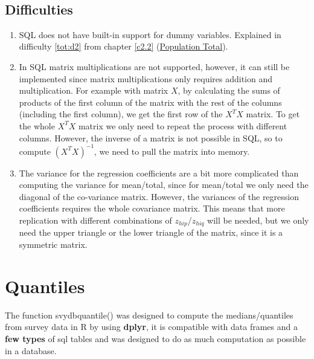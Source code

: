 \\
\subsection{Difficulties}
\begin{enumerate}
\item {\sf SQL} does not have built-in support for dummy variables. Explained in difficulty \ref{tot:d2} from chapter \ref{c2.2} (\hyperref[c2:tot]{Population Total}).

\item In {\sf SQL} matrix multiplications are not supported, however, it can still be implemented since matrix multiplications only requires addition and multiplication. For example with matrix $X$, by calculating the sums of products of the first column of the matrix with the rest of the columns (including the first column), we get the first row of the $X^TX$ matrix. To get the whole $X^TX$ matrix we only need to repeat the process with different columns. However, the inverse of a matrix is not possible in {\sf SQL}, so to compute $(X^TX)^{-1}$, we need to pull the matrix into memory. 

\item The variance for the regression coefficients are a bit more complicated than computing the variance for mean/total, since for mean/total we only need the diagonal of the co-variance matrix. However, the variances of the regression coefficients requires the whole covariance matrix. This means that more replication with different combinations of $z_{hip}$/$z_{hiq}$ will be needed, but we only need the upper triangle or the lower triangle of the matrix, since it is a symmetric matrix.
\end{enumerate}



\newpage
\section{Quantiles}

The function {\ttfamily svydbquantile()} was designed to compute the medians/quantiles from survey data in {\sf R} by using {\bf dplyr}, it is compatible with data frames and a {\bf few types} of sql tables and was designed to do as much computation as possible in a database.\\

